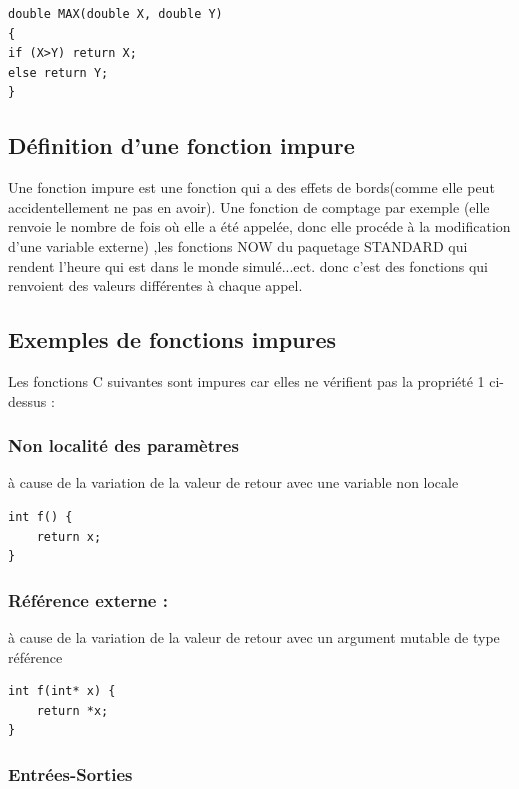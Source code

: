 \documentclass[12pt,titlepage]{article}
\begin{document}
\begin{lstlisting}
double MAX(double X, double Y)
{
if (X>Y) return X;
else return Y;
}
\end{lstlisting}

\subsection{Définition d’une fonction impure}

Une fonction impure est une fonction qui a des effets de bords(comme elle peut accidentellement ne pas en avoir).
Une fonction de comptage par exemple (elle renvoie le nombre de fois où elle a été appelée, donc elle procéde à la modification d’une variable externe) ,les fonctions NOW du paquetage STANDARD qui rendent l’heure qui est dans le monde simulé...ect. donc c'est des fonctions qui renvoient des valeurs différentes à chaque appel.\cite{fctimpures}

\subsection{Exemples de fonctions impures }
Les fonctions C suivantes sont impures car elles ne vérifient pas la propriété 1 ci-dessus :

\subsubsection{Non localité des paramètres}

à cause de la variation de la valeur de retour avec une variable non locale

\begin{lstlisting}
int f() {
    return x;
}
\end{lstlisting}

\subsubsection{Référence externe :}

à cause de la variation de la valeur de retour avec un argument mutable de type référence

\begin{lstlisting}
int f(int* x) {
    return *x; 
}
\end{lstlisting}

\subsubsection{Entrées-Sorties}
\end{document}
